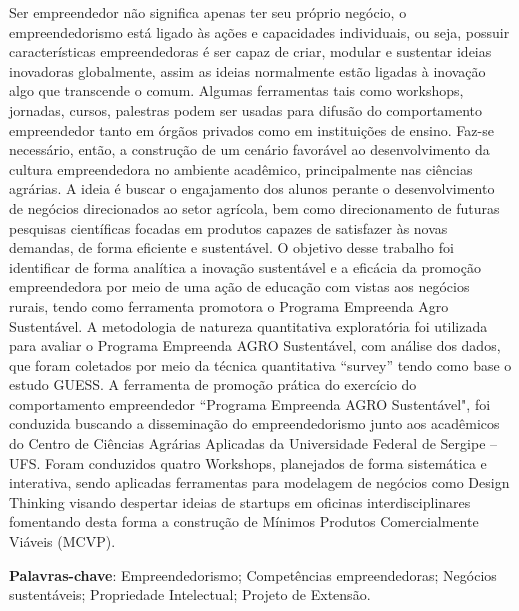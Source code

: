 \setlength{\absparsep}{18pt} %
\begin{resumo}


Ser empreendedor não significa apenas ter seu próprio negócio, o empreendedorismo está ligado às ações e capacidades individuais, ou seja, possuir características empreendedoras é ser capaz de criar, modular e sustentar ideias inovadoras globalmente, assim as ideias normalmente estão ligadas à inovação algo que transcende o comum. Algumas ferramentas tais como workshops, jornadas, cursos, palestras podem ser usadas para difusão do comportamento empreendedor tanto em órgãos privados como em instituições de ensino. Faz-se necessário, então, a construção de um cenário favorável ao desenvolvimento da cultura empreendedora no ambiente acadêmico, principalmente nas ciências agrárias. A ideia é buscar o engajamento dos alunos perante o desenvolvimento de negócios direcionados ao setor agrícola, bem como direcionamento de futuras pesquisas científicas focadas em produtos capazes de satisfazer às novas demandas, de forma eficiente e sustentável. O objetivo desse trabalho foi identificar de forma analítica a inovação sustentável e a eficácia da promoção empreendedora por meio de uma ação de educação com vistas aos negócios rurais, tendo como ferramenta promotora o Programa Empreenda Agro Sustentável. A metodologia de natureza quantitativa exploratória foi utilizada para avaliar o Programa Empreenda AGRO Sustentável, com análise dos dados, que foram coletados por meio da técnica quantitativa “survey” tendo como base o estudo GUESS. A ferramenta de promoção prática do exercício do comportamento empreendedor “Programa Empreenda AGRO Sustentável", foi conduzida buscando a disseminação do empreendedorismo junto aos acadêmicos do Centro de Ciências Agrárias Aplicadas da Universidade Federal de Sergipe – UFS. Foram conduzidos quatro Workshops, planejados de forma sistemática e interativa, sendo aplicadas ferramentas para modelagem de negócios como Design Thinking visando despertar ideias de startups em oficinas interdisciplinares fomentando desta forma a construção de Mínimos Produtos Comercialmente Viáveis (MCVP).



 \textbf{Palavras-chave}: Empreendedorismo; Competências empreendedoras; Negócios sustentáveis; Propriedade Intelectual; Projeto de Extensão.
\end{resumo}